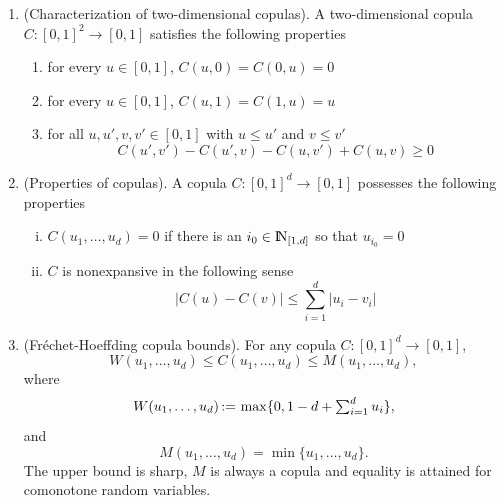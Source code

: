 \documentclass[a4paper,10pt]{scrbook}
\begin{document}
\begin{enumerate}
 \item (Characterization of two-dimensional copulas). A two-dimensional copula 
       \(C: [0,1]^2 \to [0,1]\) satisfies the following properties
       \begin{enumerate}[i]
        \item for every \(u\in[0,1]\), \(C(u,0) = C(0,u) = 0\)
        \item for every \(u\in[0,1]\), \(C(u, 1) = C(1, u) = u\)
        \item for all \(u,u',v,v' \in [0,1]\) with \(u\leq u'\) and \(v\leq v'\)
        \[
         C(u', v')  - C(u', v) - C(u,v') + C(u,v) \geq 0
        \]
       \end{enumerate}
 
 \item (Properties of copulas). A copula \(C:[0,1]^d\to[0,1]\) possesses the following 
       properties
       \begin{enumerate}[i.]
        \item \(C(u_1, \ldots, u_d)=0\) if there is an \(i_0\in\N_{[1,d]}\) so that \(u_{i_0}=0\)
        \item \(C\) is nonexpansive in the following sense
        \[
         |C(u) - C(v)| \leq \sum_{i=1}^{d}|u_i - v_i|
        \]

       \end{enumerate}


 \item (Fr{\'e}chet-Hoeffding copula bounds). For any copula \(C:[0,1]^d\to[0,1]\), 
       \[
        W(u_1,\ldots, u_d) \leq C(u_1,\ldots, u_d) \leq M(u_1,\ldots, u_d),
       \]
       where 
       \[
        W(u_1,\ldots, u_d) {}\mathop{\mathrel{:}=}{} \max\{0, 1-d+\textstyle\sum_{i=1}^{d}u_i\},
       \]
       and
       \[
        M(u_1,\ldots, u_d) = \min\{u_1,\ldots, u_d\}.
       \]
       The upper bound is sharp, \(M\) is always a copula and equality is attained
       for comonotone random variables. 
\end{enumerate}
\end{document}
